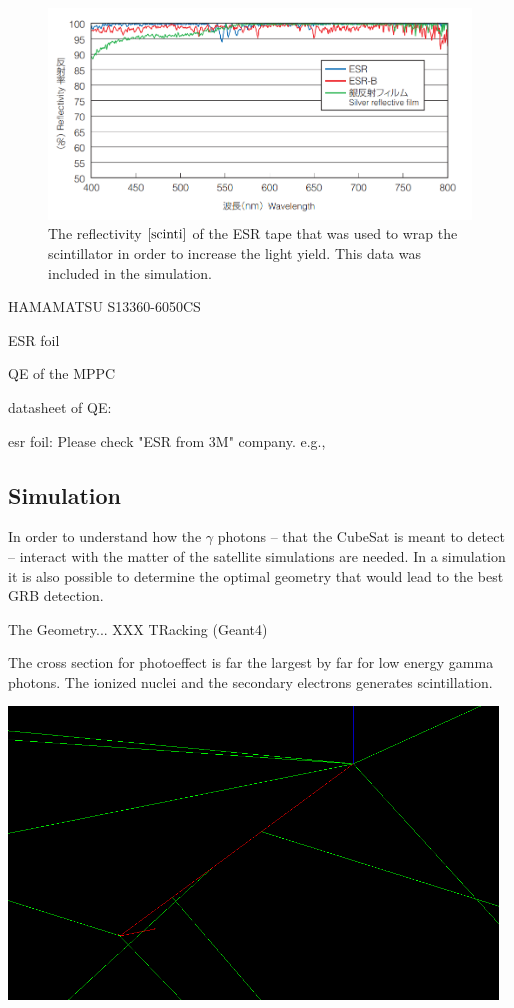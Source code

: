 \documentclass[12pt, a4paper,titlepage]{article}
\numberwithin{equation}{section}
\numberwithin{figure}{section}
\begin{document}
\begin{figure}[H]
\centering
\includegraphics[width=130.0mm]{images/reflectivity.png}
\caption{The reflectivity $\cite{scinti}$ of the ESR tape that was used to wrap the scintillator in order to increase the light yield. This data was included in the simulation.}
\label{fig:refl}
\end{figure}


HAMAMATSU S13360-6050CS

ESR foil

QE \cite{qe} of the MPPC


datasheet of QE:

esr \cite{esr} foil:
Please check "ESR from 3M" company. e.g.,



\subsection{Simulation}

In order to understand how the $\gamma$ photons -- that the CubeSat is meant to detect -- interact with the matter of the satellite simulations are needed. In a simulation it is also possible to determine the optimal geometry that would lead to the best GRB detection. 

The Geometry... XXX TRacking (Geant4) 


The cross section for photoeffect is far the largest by far for low energy gamma photons.
The ionized nuclei and the secondary electrons generates scintillation.

\includegraphics[width=130.0mm]{images/secondary.png}
\end{document}

